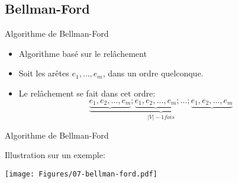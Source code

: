 
\subsection{Bellman-Ford}

\begin{frame}{Algorithme de Bellman-Ford}

\begin{center}
{\small
{}}
\end{center}

\bigskip

\begin{itemize}
\item Algorithme basé sur le relâchement
\item Soit les arêtes $e_1,\ldots,e_m$, dans un ordre quelconque.
\item Le relâchement se fait dans cet ordre:
$$\underbrace{\underbrace{e_1,e_2,\ldots,e_m};\underbrace{e_1,e_2,\ldots,e_m};\ldots;\underbrace{e_1,e_2,\ldots,e_m}}_{|V|-1 fois}$$
\end{itemize}

\end{frame}

\begin{frame}{Algorithme de Bellman-Ford}

\begin{center}
{\small
{}}
\end{center}

\bigskip

Illustration sur un exemple:

\centerline{\texttt{[image: Figures/07-bellman-ford.pdf]}}

\end{frame}



